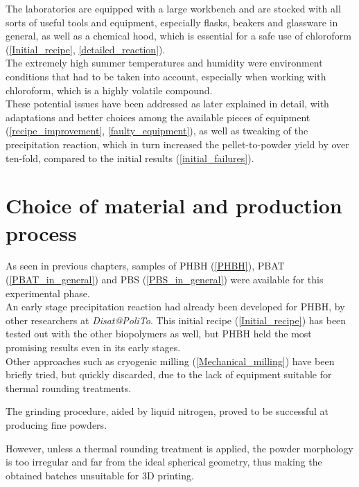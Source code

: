 \documentclass{article}
\begin{document}
    The laboratories are equipped with a large workbench and are stocked with all sorts of useful tools and equipment, especially flasks,
    beakers and glassware 
    in general, as well as a chemical hood, which is essential for a safe use of chloroform 
    (\ref{Initial_recipe}, \ref{detailed_reaction}). \\ 

    The extremely high summer temperatures and humidity were environment conditions that had to be taken into account, 
    especially when working with chloroform, which is a highly volatile compound. \\

    These potential issues have been addressed as later explained in detail, with adaptations and better choices among the available pieces of
    equipment (\ref{recipe_improvement}, \ref{faulty_equipment}), as well as tweaking of the precipitation 
    reaction, which in turn increased the pellet-to-powder yield by over ten-fold, compared to the initial 
    results (\ref{initial_failures}).



    \clearpage
    \section{Choice of material and production process\label{Choice_material_process}}

    As seen in previous chapters, samples of PHBH (\ref{PHBH}), PBAT (\ref{PBAT_in_general}) and 
    PBS (\ref{PBS_in_general}) were available for this experimental phase. \\ 

    An early stage precipitation reaction had already been developed for PHBH, by other researchers at \textit{Disat@PoliTo}. 
    This initial recipe (\ref{Initial_recipe}) has been tested out with the other biopolymers as well, but PHBH held the most promising 
    results even in its early stages. \\ 

    Other approaches such as cryogenic milling (\ref{Mechanical_milling}) have been briefly tried, but quickly 
    discarded, due to the lack of equipment suitable for thermal rounding treatments. 

    The grinding procedure, aided by liquid nitrogen, proved to be successful at producing fine powders. 

    However, unless a thermal rounding treatment is applied, the powder 
    morphology is too irregular and far from the ideal spherical geometry, thus making the 
    obtained batches unsuitable for 3D printing. \\  
\end{document}
